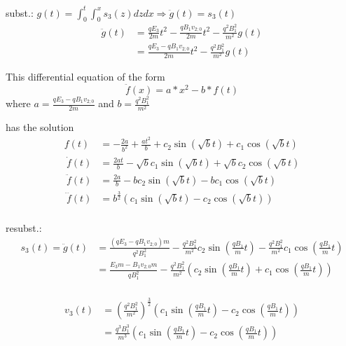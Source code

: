 \documentclass[english, a4paper, 10pt]{article}
\begin{document}
subst.: $g(t) = \int_0^t \int_0^x s_3(z) dz dx \Rightarrow \ddot{g}(t) = s_3(t)$
%
\begin{equation}
\begin{split}
\ddot{g}(t) 	&= \frac{q E_3}{2m} t^2 - \frac{q B_1 v_{2;0}}{2m} t^2 - \frac{q^2 B_1^2}{m^2} g(t) \\\
			&= \frac{q E_3 - q B_1 v_{2;0}}{2m} t^2 - \frac{q^2 B_1^2}{m^2} g(t)
\end{split}
\end{equation}

This differential equation of the form 
\begin{equation}
\ddot{f}(x) = a * x^2 - b * f(t)
\end{equation}
where $a=\frac{q E_3 - q B_1 v_{2;0}}{2m}$ and $b=\frac{q^2 B_1^2}{m^2}$

has the solution
\begin{equation}
\begin{split}
f(t) &= -\frac{2 a}{b^2} + \frac{a t^2}{b} + c_2 \sin\left(\sqrt{b} t\right) + c_1 \cos\left(\sqrt{b} t\right) \\\
\dot{f}(t) &= \frac{2 a t}{b} - \sqrt{b} c_1 \sin\left(\sqrt{b} t\right) + \sqrt{b} c_2 \cos\left(\sqrt{b} t\right) \\\
\ddot{f}(t) &= \frac{2 a}{b} - b c_2 \sin\left(\sqrt{b} t\right) - b c_1 \cos\left(\sqrt{b} t\right) \\\
\dddot{f}(t) &= b^{\frac{3}{2}} \left(c_1 \sin\left(\sqrt{b} t\right) - c_2 \cos\left(\sqrt{b} t\right)\right) \\\
\end{split}
\end{equation}

resubst.:
\begin{equation}
\begin{split}
s_3(t) = \ddot{g}(t) &= \frac{(q E_3 - q B_1 v_{2;0}) m}{q^2 B_1^2} - \frac{q^2 B_1^2}{m^2} c_2 \sin\left(\frac{q B_1}{m} t\right) - \frac{q^2 B_1^2}{m^2} c_1 \cos\left(\frac{q B_1}{m} t\right) \\\
&= \frac{E_3 m - B_1 v_{2;0} m}{q B_1^2} - \frac{q^2 B_1^2}{m^2} \left(c_2 \sin\left(\frac{q B_1}{m} t\right) + c_1 \cos\left(\frac{q B_1}{m} t\right)\right) \\\
\end{split}
\end{equation}

\begin{equation}
\begin{split}
v_3(t)  &= \left(\frac{q^2 B_1^2}{m^2}\right)^{\frac{3}{2}} \left(c_1 \sin\left(\frac{q B_1}{m} t\right) - c_2 \cos\left(\frac{q B_1}{m} t\right)\right) \\\
		&= \frac{q^3 B_1^3}{m^3} \left(c_1 \sin\left(\frac{q B_1}{m} t\right) - c_2 \cos\left(\frac{q B_1}{m} t\right)\right)
\end{split}
\end{equation}
\end{document}
